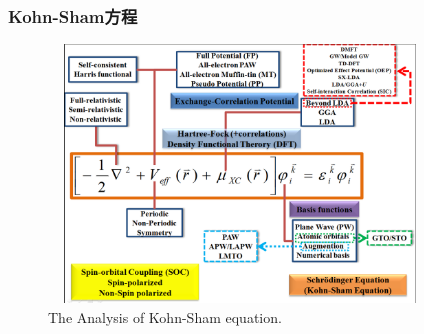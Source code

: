 \documentclass[cjk,slidestop,compress,mathserif,blue]{beamer}
\begin{document}
\frame                               %
{
	\frametitle{\textrm{Kohn-Sham}方程}
\begin{figure}[h!]
\centering
\vspace*{-0.21in}
\hspace*{-0.1in}
\includegraphics[height=2.7in,width=4.0in,viewport=2 5 1162 880,clip]{Figures/DFT.png}
\caption{\tiny \textrm{The Analysis of Kohn-Sham equation.}}%
\label{DFT}
\end{figure}
}
\end{document}
